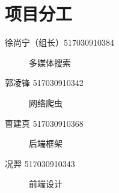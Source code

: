 \documentclass[main.tex]{subfiles}
\begin{document}
\section{项目分工}

\begin{description}
	\item [徐尚宁（组长）517030910384] 多媒体搜索
	\item [郭凌锋 517030910342] 网络爬虫
	\item [曹建真 517030910368] 后端框架
	\item [况羿 517030910343] 前端设计
\end{description}
\end{document}
